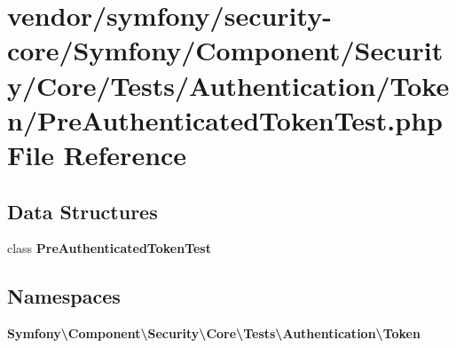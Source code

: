 \section{vendor/symfony/security-\/core/\+Symfony/\+Component/\+Security/\+Core/\+Tests/\+Authentication/\+Token/\+Pre\+Authenticated\+Token\+Test.php File Reference}
\label{_pre_authenticated_token_test_8php}
\subsection*{Data Structures}
\begin{DoxyCompactItemize}
\item 
class {\bf Pre\+Authenticated\+Token\+Test}
\end{DoxyCompactItemize}
\subsection*{Namespaces}
\begin{DoxyCompactItemize}
\item 
 {\bf Symfony\textbackslash{}\+Component\textbackslash{}\+Security\textbackslash{}\+Core\textbackslash{}\+Tests\textbackslash{}\+Authentication\textbackslash{}\+Token}
\end{DoxyCompactItemize}
